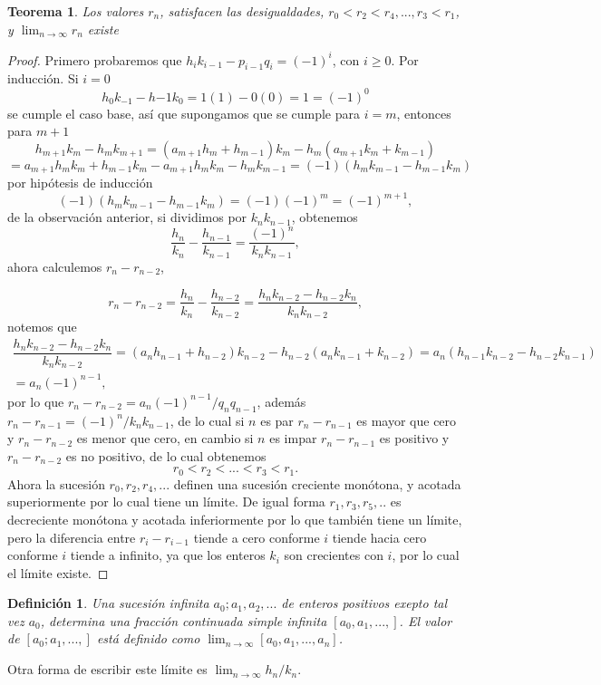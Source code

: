 \documentclass[11pt, article]{article}
\newtheorem{theorem}{Teorema} %
\newtheorem{definition}{Definición}
\begin{document}
    \begin{theorem}
    Los valores $r_n$, satisfacen las desigualdades, $r_0<r_2<r_4,...,r_3<r_1$, y $\displaystyle\lim_{n\to\infty}r_n$ existe 
    \end{theorem}
    \begin{proof}
        Primero probaremos que $h_ik_{i-1}-p_{i-1}q_{i}=(-1)^i$, con $i\geq 0$.
    Por inducción. Si $i=0$
        \[ 
        h_0k_{-1}-h{-1}k_0=1(1)-0(0)=1=(-1)^0
        \]
    se cumple el caso base, así que supongamos que se cumple para $i=m$, entonces para $m+1$
    \[
    h_{m+1}k_{m}-h_{m}k_{m+1}=(a_{m+1}h_{m} + h_{m-1})k_m-h_m(a_{m+1}k_m+k_{m-1})
    \]
    \[
    =a_{m+1}h_mk_m+h_{m-1}k_m-a_{m+1}h_mk_m-h_mk_{m-1}
    =(-1)(h_mk_{m-1}-h_{m-1}k_m)
    \]
    por hipótesis de inducción 
        \[
        (-1)(h_m k_{m-1}-h_{m-1}k_m)=(-1)(-1)^m=(-1)^{m+1},
        \]
    de la observación anterior, si dividimos por $k_nk_{n-1}$, obtenemos 
        \[
        \dfrac{h_n}{k_n}-\dfrac{h_{n-1}}{k_{n-1}}=\dfrac{(-1)^n}{k_nk_{n-1}},
        \]
    ahora calculemos $r_n-r_{n-2}$,
    
        \[
        r_n-r_{n-2}=\dfrac{h_n}{k_n}-\dfrac{h_{n-2}}{k_{n-2}}=\dfrac{h_nk_{n-2}-h_{n-2}k_n}{k_nk_{n-2}},
        \]
        notemos que 
        \begin{align*}
        \dfrac{h_nk_{n-2}-h_{n-2}k_n}{k_nk_{n-2}}= (a_n h_{n-1}+h_{n-2})k_{n-2}-h_{n-2}(a_n k_{n-1}+k_{n-2})= a_n(h_{n-1}k_{n-2}-h_{n-2}k_{n-1})\\=a_n(-1)^{n-1},
        \end{align*}
    por lo que $r_n-r_{n-2}=a_n(-1)^{n-1}/q_nq_{n-1}$, además $r_n-r_{n-1}=(-1)^n/k_nk_{n-1}$, de lo cual si $n$ es par $r_n-r_{n-1}$ es mayor que cero y $r_n-r_{n-2}$ es menor que cero, en cambio si $n$ es impar $r_n-r_{n-1}$ es positivo y $r_n-r_{n-2}$ es no positivo, de lo cual obtenemos
    \[
    r_0<r_2<...<r_3<r_1.
    \]
    Ahora la sucesión $r_0,r_2,r_4,...$ definen una sucesión creciente monótona, y acotada superiormente por lo cual tiene un límite. De igual forma $r_1,r_3,r_5,..$ es decreciente monótona y acotada inferiormente por lo que también tiene un límite, pero la diferencia entre $r_i-r_{i-1}$ tiende a cero conforme $i$ tiende hacia cero conforme $i$ tiende a infinito, ya que los enteros $k_i$ son crecientes con $i$, por lo cual el límite existe. 
    \end{proof}
    \begin{definition}
    Una sucesión infinita $a_0; a_1, a_2,...$ de enteros positivos exepto tal vez $a_0$, determina una fracción continuada simple infinita $[a_0, a_1, ..., ]$. El valor de $[a_0; a_1, ..., ]$ está definido como $\displaystyle\lim_{n\to\infty}[a_0, a_1, ..., a_n]$.
    \end{definition}  
    Otra forma de escribir este límite es $\lim_{n\to\infty} h_n/k_n$. 
\end{document}

